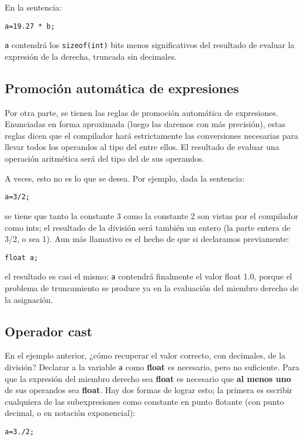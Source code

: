 En la sentencia:
\begin{lstlisting}
a=19.27 * b;	
\end{lstlisting}
\lstinline{a} contendrá los \lstinline{sizeof(int)} bits menos significativos del resultado de evaluar la expresión de la
derecha, truncada sin decimales.

\subsection{Promoción automática de expresiones}

Por otra parte, se tienen las reglas de promoción automática de expresiones. Enunciadas en forma
aproximada (luego las daremos con más precisión), estas reglas dicen que el compilador hará
estrictamente las conversiones necesarias para llevar todos los operandos al tipo del  entre ellos. El
resultado de evaluar una operación aritmética será del tipo del  de sus operandos.

A veces, esto no es lo que se desea. Por ejemplo, dada la sentencia:
\begin{lstlisting}
a=3/2;
\end{lstlisting}

se tiene que tanto la constante 3 como la constante 2 son vistas por el compilador como ints; el
resultado de la división será también un entero (la parte entera de 3/2, o sea 1). Aun más llamativo es
el hecho de que si declaramos previamente:
\begin{lstlisting}
float a;
\end{lstlisting}
el resultado es casi el mismo: \lstinline{a} contendrá finalmente el valor float 1.0, porque el problema de
truncamiento se produce ya en la evaluación del miembro derecho de la asignación.


\subsection{Operador cast}
En el ejemplo anterior, ¿cómo recuperar el valor correcto, con decimales, de la división? Declarar a la variable \lstinline{a} como \textbf{float} es necesario,
pero no suficiente. Para que la expresión del miembro derecho sea \textbf{float} es necesario que \textbf{al menos uno}
de sus operandos sea \textbf{float}. Hay dos formas de lograr esto; la primera es escribir cualquiera de las
subexpresiones como constante en punto flotante (con punto decimal, o en notación exponencial):
\begin{lstlisting}
a=3./2;
\end{lstlisting}

